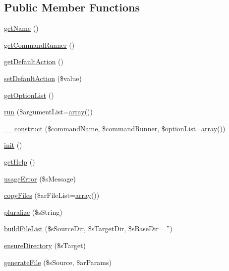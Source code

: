 \subsection*{Public Member Functions}
\begin{DoxyCompactItemize}
\item 
\hyperlink{classCPSConsoleCommand_a3d0963e68bb313b163a73f2803c64600}{getName} ()
\item 
\hyperlink{classCPSConsoleCommand_a0e71a85d12a79d46586c3104df659371}{getCommandRunner} ()
\item 
\hyperlink{classCPSConsoleCommand_a0ac27faf20ba937fb6788069c30f133a}{getDefaultAction} ()
\item 
\hyperlink{classCPSConsoleCommand_a745456ed2b7cb074ae0db12c6217dfca}{setDefaultAction} (\$value)
\item 
\hyperlink{classCPSConsoleCommand_a52c35bbfee5c247f621ad18691e23fdd}{getOptionList} ()
\item 
\hyperlink{classCPSConsoleCommand_acd971ca71798c549bd4f74ed4ee6729e}{run} (\$argumentList=\hyperlink{list_8php_aa3205d038c7f8feb5c9f01ac4dfadc88}{array}())
\item 
\hyperlink{classCPSConsoleCommand_ab09e5845106f7cca57145104f6fbca21}{\_\-\_\-construct} (\$commandName, \$commandRunner, \$optionList=\hyperlink{list_8php_aa3205d038c7f8feb5c9f01ac4dfadc88}{array}())
\item 
\hyperlink{classCPSConsoleCommand_a4be4055f3361d4800e16bc2e2e38cda6}{init} ()
\item 
\hyperlink{classCPSConsoleCommand_a4cc928ef4def3a84c181608d31bf7608}{getHelp} ()
\item 
\hyperlink{classCPSConsoleCommand_a1ede9bfd28a933f66275ac67aedbc661}{usageError} (\$sMessage)
\item 
\hyperlink{classCPSConsoleCommand_af999d4abb0f04b22df2e4c8b6084d942}{copyFiles} (\$arFileList=\hyperlink{list_8php_aa3205d038c7f8feb5c9f01ac4dfadc88}{array}())
\item 
\hyperlink{classCPSConsoleCommand_a58127876ddedbfbce1ae272364764aac}{pluralize} (\$sString)
\item 
\hyperlink{classCPSConsoleCommand_a25062bb675081228b1e9c0a5c11f9d7d}{buildFileList} (\$sSourceDir, \$sTargetDir, \$sBaseDir= '')
\item 
\hyperlink{classCPSConsoleCommand_abb9234be873ca733205fa23f41ce37b5}{ensureDirectory} (\$sTarget)
\item 
\hyperlink{classCPSConsoleCommand_ad45025113981b4406a4a6488b3d7e0e3}{generateFile} (\$sSource, \$arParams)

\end{DoxyCompactItemize}
